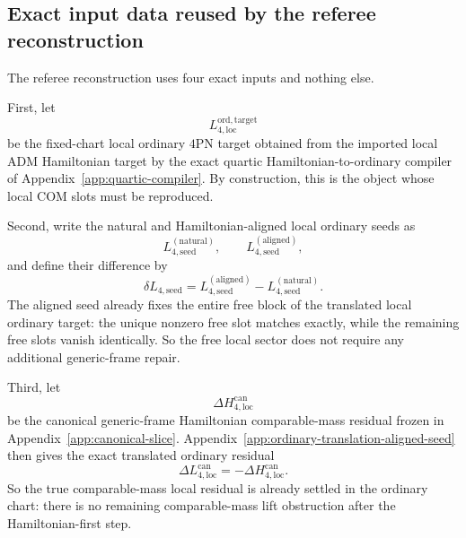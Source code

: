 \documentclass[11pt]{article}
\begin{document}
\subsection{Exact input data reused by the referee reconstruction}
\label{app:local-referee-reconstruction-inputs}

The referee reconstruction uses four exact inputs and nothing else.

First, let
\begin{equation}
L_{4,\mathrm{loc}}^{\mathrm{ord,target}}
\label{eq:app-local-referee-target-def}
\end{equation}
be the fixed-chart local ordinary $4$PN target obtained from the imported local
ADM Hamiltonian target by the exact quartic Hamiltonian-to-ordinary compiler of
Appendix~\ref{app:quartic-compiler}.  By construction, this is the object whose
local COM slots must be reproduced.

Second, write the natural and Hamiltonian-aligned local ordinary seeds as
\begin{equation}
L_{4,\mathrm{seed}}^{(\mathrm{natural})},
\qquad
L_{4,\mathrm{seed}}^{(\mathrm{aligned})},
\label{eq:app-local-referee-natural-aligned-seeds}
\end{equation}
and define their difference by
\begin{equation}
\delta L_{4,\mathrm{seed}}
=
L_{4,\mathrm{seed}}^{(\mathrm{aligned})}
-
L_{4,\mathrm{seed}}^{(\mathrm{natural})}.
\label{eq:app-local-referee-delta-seed}
\end{equation}
The aligned seed already fixes the entire free block of the translated local
ordinary target: the unique nonzero free slot matches exactly, while the
remaining free slots vanish identically.  So the free local sector does not
require any additional generic-frame repair.

Third, let
\begin{equation}
\Delta H_{4,\mathrm{loc}}^{\mathrm{can}}
\label{eq:app-local-referee-hcan}
\end{equation}
be the canonical generic-frame Hamiltonian comparable-mass residual frozen in
Appendix~\ref{app:canonical-slice}.  Appendix~\ref{app:ordinary-translation-aligned-seed}
then gives the exact translated ordinary residual
\begin{equation}
\Delta L_{4,\mathrm{loc}}^{\mathrm{can}}
=
-\Delta H_{4,\mathrm{loc}}^{\mathrm{can}}.
\label{eq:app-local-referee-sign-flip}
\end{equation}
So the true comparable-mass local residual is already settled in the ordinary
chart: there is no remaining comparable-mass lift obstruction after the
Hamiltonian-first step.
\end{document}
